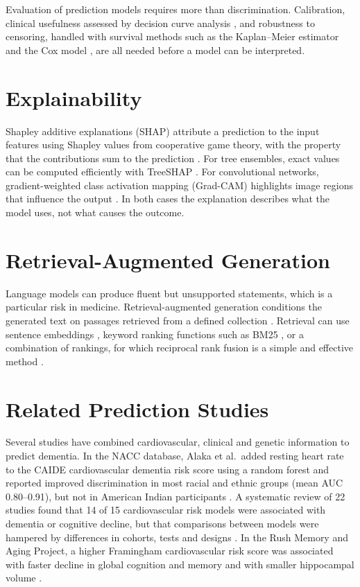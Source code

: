 Evaluation of prediction models requires more than discrimination. Calibration, clinical usefulness assessed by decision curve analysis \cite{vickers2006}, and robustness to censoring, handled with survival methods such as the Kaplan--Meier estimator \cite{kaplan1958} and the Cox model \cite{cox1972}, are all needed before a model can be interpreted.

\section{Explainability}

Shapley additive explanations (SHAP) attribute a prediction to the input features using Shapley values from cooperative game theory, with the property that the contributions sum to the prediction \cite{lundberg2017}. For tree ensembles, exact values can be computed efficiently with TreeSHAP \cite{lundberg2020}. For convolutional networks, gradient-weighted class activation mapping (Grad-CAM) highlights image regions that influence the output \cite{selvaraju2017}. In both cases the explanation describes what the model uses, not what causes the outcome.

\section{Retrieval-Augmented Generation}

Language models can produce fluent but unsupported statements, which is a particular risk in medicine. Retrieval-augmented generation conditions the generated text on passages retrieved from a defined collection \cite{lewis2020}. Retrieval can use sentence embeddings \cite{reimers2019}, keyword ranking functions such as BM25 \cite{robertson2009}, or a combination of rankings, for which reciprocal rank fusion is a simple and effective method \cite{cormack2009}.

\section{Related Prediction Studies}

Several studies have combined cardiovascular, clinical and genetic information to predict dementia. In the NACC database, Alaka et al.\ added resting heart rate to the CAIDE cardiovascular dementia risk score using a random forest and reported improved discrimination in most racial and ethnic groups (mean AUC 0.80--0.91), but not in American Indian participants \cite{alaka2025}. A systematic review of 22 studies found that 14 of 15 cardiovascular risk models were associated with dementia or cognitive decline, but that comparisons between models were hampered by differences in cohorts, tests and designs \cite{jia2023}. In the Rush Memory and Aging Project, a higher Framingham cardiovascular risk score was associated with faster decline in global cognition and memory and with smaller hippocampal volume \cite{song2020}.

